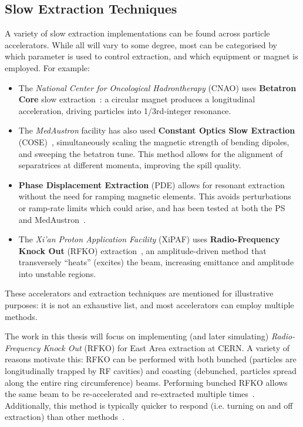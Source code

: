 \documentclass[a4paper,twoside,11pt]{report}
\begin{document}
\subsection{Slow Extraction Techniques}\label{sec:rfko}

A variety of slow extraction implementations can be found across particle accelerators. While all will vary to some degree, most can be categorised by which parameter is used to control extraction, and which equipment or magnet is employed. For example:
\begin{itemize}
  \item The \textit{National Center for Oncological Hadrontherapy} (CNAO) uses \textbf{Betatron Core} slow extraction~\cite{Falbo:IPAC2018-TUZGBF3}: a circular magnet produces a longitudinal acceleration, driving particles into 1/3rd-integer resonance.
  \item The \textit{MedAustron} facility has also used \textbf{Constant Optics Slow Extraction} (COSE)~\cite{ArrutiaSota:2845862}, simultaneously scaling the magnetic strength of bending dipoles, and sweeping the betatron tune. This method allows for the alignment of separatrices at different momenta, improving the spill quality.
  \item \textbf{Phase Displacement Extraction} (PDE) allows for resonant extraction without the need for ramping magnetic elements. This avoids perturbations or ramp-rate limits which could arise, and has been tested at both the PS and MedAustron~\cite{ARRUTIASOTA2022167007}.
  \item The \textit{Xi’an Proton Application Facility} (XiPAF) uses \textbf{Radio-Frequency Knock Out} (RFKO) extraction~\cite{Yao:2016cnf}, an amplitude-driven method that transversely ``heats'' (excites) the beam, increasing emittance and amplitude into unstable regions.
\end{itemize}
These accelerators and extraction techniques are mentioned for illustrative purposes: it is not an exhaustive list, and most accelerators can employ multiple methods.
 
The work in this thesis will focus on implementing (and later simulating) \textit{Radio-Frequency Knock Out} (RFKO) for East Area extraction at CERN. A variety of reasons motivate this: RFKO can be performed with both bunched (particles are longitudinally trapped by RF cavities) and coasting (debunched, particles spread along the entire ring circumference) beams. Performing bunched RFKO allows the same beam to be re-accelerated and re-extracted multiple times~\cite{russo}. Additionally, this method is typically quicker to respond (i.e. turning on and off extraction) than other methods~\cite{Furukawa2002PROGRESSOR, FURUKAWA200259, NODA2002241}.
\end{document}
